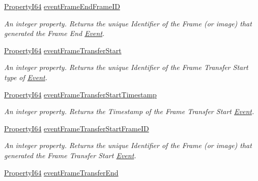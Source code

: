 \begin{DoxyCompactItemize}
\hyperlink{group___common_interface_ga81749b2696755513663492664a18a893}{Property\+I64} \hyperlink{classmv_i_m_p_a_c_t_1_1acquire_1_1_gen_i_cam_1_1_event_control_a24faf4ecd22c86df6fb1e006569d1de5}{event\+Frame\+End\+Frame\+I\+D}
\begin{DoxyCompactList}\small\item\em An integer property. Returns the unique Identifier of the Frame (or image) that generated the Frame End \hyperlink{classmv_i_m_p_a_c_t_1_1acquire_1_1_event}{Event}. \end{DoxyCompactList}\item 
\hyperlink{group___common_interface_ga81749b2696755513663492664a18a893}{Property\+I64} \hyperlink{classmv_i_m_p_a_c_t_1_1acquire_1_1_gen_i_cam_1_1_event_control_a88c174f3955c3cda0d95f67018d63c7c}{event\+Frame\+Transfer\+Start}
\begin{DoxyCompactList}\small\item\em An integer property. Returns the unique Identifier of the Frame Transfer Start type of \hyperlink{classmv_i_m_p_a_c_t_1_1acquire_1_1_event}{Event}. \end{DoxyCompactList}\item 
\hyperlink{group___common_interface_ga81749b2696755513663492664a18a893}{Property\+I64} \hyperlink{classmv_i_m_p_a_c_t_1_1acquire_1_1_gen_i_cam_1_1_event_control_a445524678070f9f3ad9fb0276fe3ef9b}{event\+Frame\+Transfer\+Start\+Timestamp}
\begin{DoxyCompactList}\small\item\em An integer property. Returns the Timestamp of the Frame Transfer Start \hyperlink{classmv_i_m_p_a_c_t_1_1acquire_1_1_event}{Event}. \end{DoxyCompactList}\item 
\hyperlink{group___common_interface_ga81749b2696755513663492664a18a893}{Property\+I64} \hyperlink{classmv_i_m_p_a_c_t_1_1acquire_1_1_gen_i_cam_1_1_event_control_a22e33a79256f88a5a3fe4c99c9d4e164}{event\+Frame\+Transfer\+Start\+Frame\+I\+D}
\begin{DoxyCompactList}\small\item\em An integer property. Returns the unique Identifier of the Frame (or image) that generated the Frame Transfer Start \hyperlink{classmv_i_m_p_a_c_t_1_1acquire_1_1_event}{Event}. \end{DoxyCompactList}\item 
\hyperlink{group___common_interface_ga81749b2696755513663492664a18a893}{Property\+I64} \hyperlink{classmv_i_m_p_a_c_t_1_1acquire_1_1_gen_i_cam_1_1_event_control_afe2e483b09bba295a83416a21f6e20fc}{event\+Frame\+Transfer\+End}

\end{DoxyCompactItemize}
